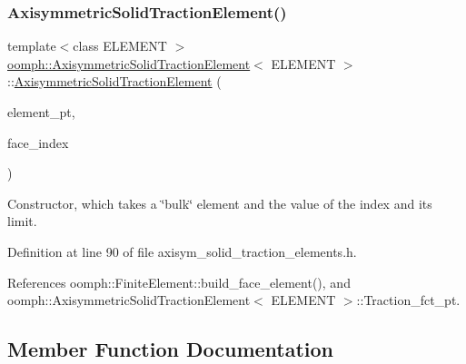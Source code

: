 \subsubsection{\texorpdfstring{Axisymmetric\+Solid\+Traction\+Element()}{AxisymmetricSolidTractionElement()}}
{\footnotesize\ttfamily template$<$class E\+L\+E\+M\+E\+NT $>$ \\
\hyperlink{classoomph_1_1AxisymmetricSolidTractionElement}{oomph\+::\+Axisymmetric\+Solid\+Traction\+Element}$<$ E\+L\+E\+M\+E\+NT $>$\+::\hyperlink{classoomph_1_1AxisymmetricSolidTractionElement}{Axisymmetric\+Solid\+Traction\+Element} (\begin{DoxyParamCaption}\item[{\hyperlink{classoomph_1_1FiniteElement}{Finite\+Element} $\ast$const \&}]{element\+\_\+pt,  }\item[{const int \&}]{face\+\_\+index }\end{DoxyParamCaption})\hspace{0.3cm}{\ttfamily [inline]}}



Constructor, which takes a \char`\"{}bulk\char`\"{} element and the value of the index and its limit. 



Definition at line 90 of file axisym\+\_\+solid\+\_\+traction\+\_\+elements.\+h.



References oomph\+::\+Finite\+Element\+::build\+\_\+face\+\_\+element(), and oomph\+::\+Axisymmetric\+Solid\+Traction\+Element$<$ E\+L\+E\+M\+E\+N\+T $>$\+::\+Traction\+\_\+fct\+\_\+pt.



\subsection{Member Function Documentation}
\mbox{\label{classoomph_1_1AxisymmetricSolidTractionElement_a49de689d7dc2efecd8bbdbd6673c1fb8}} 
